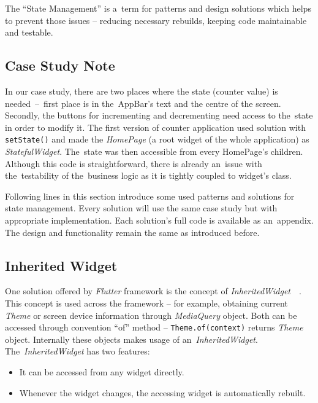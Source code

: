 The ``State Management'' is a~term for patterns and design solutions which helps to prevent those issues -- reducing necessary rebuilds, keeping code maintainable and testable. 
\subsection{Case Study Note}
In our case study, there are two places where the state (counter value) is needed~--~first place is in the~AppBar's text and the centre of the screen. Secondly, the buttons for incrementing and decrementing need access to the~state in order to modify it. The first version of counter application used solution with \verb|setState()| and made the \textit{HomePage} (a root widget of the whole application) as \textit{StatefulWidget}. The~state was then accessible from every HomePage's children. Although this code is straightforward, there is already an~issue with the~testability of the~business logic as it is tightly coupled to widget's class.  

Following lines in this section introduce some used patterns and solutions for state management.  Every solution will use the same case study but with appropriate implementation. Each solution's full code is available as an~appendix. The design and functionality remain the same as introduced before.
\subsection{Inherited Widget}
One solution offered by \textit{Flutter} framework is the concept of \textit{InheritedWidget}~\cite{flutter-inherited-widget}~\cite{notion-widget-didier}. This concept is used across the framework -- for example, obtaining current \textit{Theme} or screen device information through \textit{MediaQuery} object. Both can be accessed through convention ``of'' method -- \verb|Theme.of(context)| returns \textit{Theme} object. Internally these objects makes usage of an~\textit{InheritedWidget}. The~\textit{InheritedWidget} has two features:

\begin{itemize}
    \item It can be accessed from any widget directly.
    \item Whenever the widget changes, the accessing widget is automatically rebuilt.
\end{itemize}

